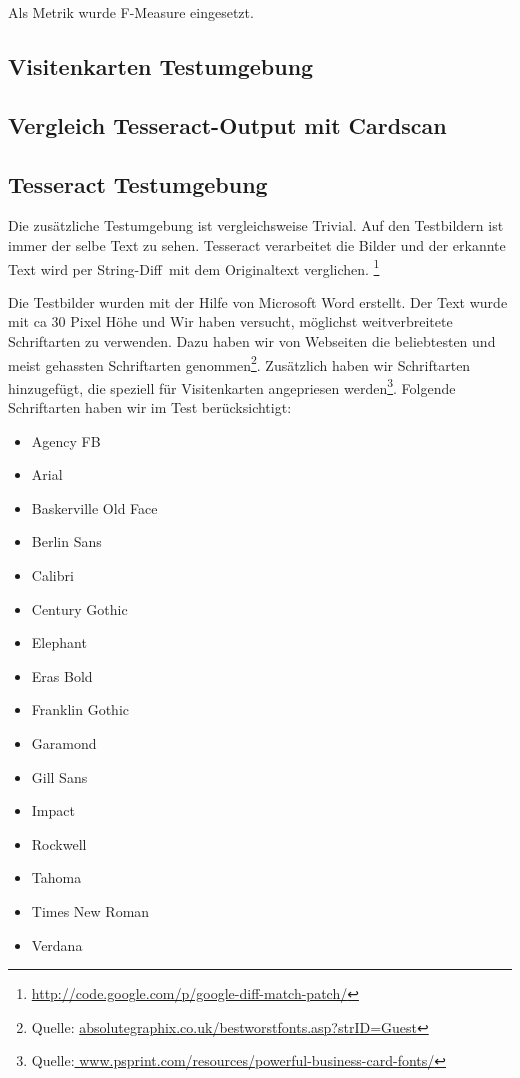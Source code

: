 \documentclass[10pt]{article}
\begin{document}
Als Metrik wurde F-Measure eingesetzt. 

\subsection{Visitenkarten Testumgebung}
\subsection{Vergleich Tesseract-Output mit Cardscan}

\subsection{Tesseract Testumgebung}
Die zusätzliche Testumgebung ist vergleichsweise Trivial. Auf den Testbildern ist immer der selbe Text zu sehen. Tesseract verarbeitet die Bilder und der erkannte Text wird per String-Diff\ mit dem Originaltext verglichen.
\footnote{\url{http://code.google.com/p/google-diff-match-patch/}}

Die Testbilder wurden mit der Hilfe von Microsoft Word erstellt. Der Text wurde mit ca 30 Pixel Höhe und 
Wir haben versucht, möglichst weitverbreitete Schriftarten zu verwenden. Dazu haben wir von Webseiten die beliebtesten und meist gehassten Schriftarten genommen\footnote{Quelle: \url{absolutegraphix.co.uk/bestworstfonts.asp?strID=Guest}}.  
Zusätzlich haben wir Schriftarten hinzugefügt, die speziell für Visitenkarten angepriesen werden\footnote{Quelle:\url{ www.psprint.com/resources/powerful-business-card-fonts/}}. Folgende Schriftarten haben wir im Test berücksichtigt:
\begin{itemize}
\item Agency FB
\item Arial
\item Baskerville Old Face
\item Berlin Sans
\item Calibri
\item Century Gothic
\item Elephant
\item Eras Bold
\item Franklin Gothic
\item Garamond
\item Gill Sans
\item Impact
\item Rockwell
\item Tahoma
\item Times New Roman
\item Verdana
\end{itemize}
\end{document}
